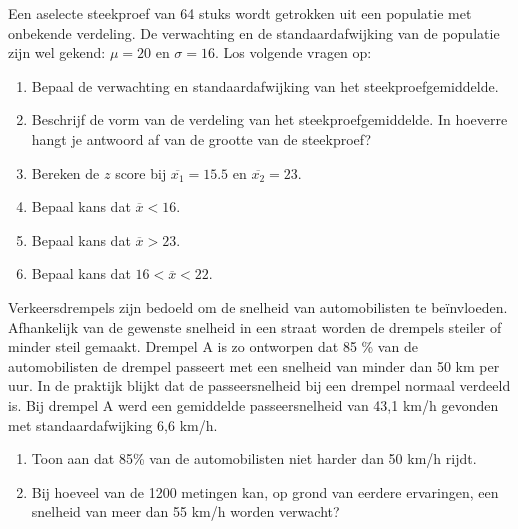 \begin{exercise}
  Een aselecte steekproef van 64 stuks wordt getrokken uit een populatie met onbekende verdeling. De verwachting en de standaardafwijking van de populatie
  zijn wel gekend: $\mu = 20$ en $\sigma=16$. Los volgende vragen op:

  \begin{enumerate}[label=\alph*.]
    \item Bepaal de verwachting en standaardafwijking van het steekproefgemiddelde.
    \item Beschrijf de vorm van de verdeling van het steekproefgemiddelde. In hoeverre hangt je antwoord af van de grootte van de steekproef?
    \item Bereken de $z$ score bij $\overline{x_{1}} = 15.5$ en $\overline{x_{2}} = 23$.
    \item Bepaal kans dat $\overline{x} <16$.
    \item Bepaal kans dat $\overline{x} > 23$.
    \item Bepaal kans dat $16< \overline{x}< 22$.
  \end{enumerate}
\end{exercise}

\begin{exercise}
  Verkeersdrempels zijn bedoeld om de snelheid van automobilisten te be\"invloeden. Afhankelijk van de gewenste snelheid in een straat worden de drempels steiler of minder steil gemaakt. Drempel A is zo ontworpen dat 85 \% van de automobilisten de drempel passeert met een snelheid van minder dan 50 km per uur. In de praktijk blijkt dat de passeersnelheid bij een drempel normaal verdeeld is. Bij drempel A werd een gemiddelde passeersnelheid van 43,1 km/h gevonden met standaardafwijking 6,6 km/h.

  \begin{enumerate}[label=\alph*.]
    \item Toon aan dat 85\% van de automobilisten niet harder dan 50 km/h rijdt.
    \item Bij hoeveel van de 1200 metingen kan, op grond van eerdere ervaringen, een snelheid van meer dan 55 km/h worden verwacht?
  \end{enumerate}
\end{exercise}

